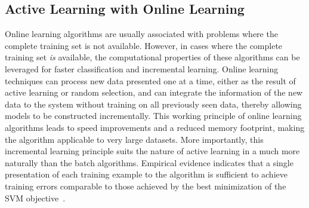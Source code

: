 \subsection{Active Learning with Online Learning}
\label{LASVM}
Online learning algorithms are usually associated with problems where the complete training set is not available. However, in cases where the complete training set \textit{is} available, the computational properties of these algorithms can be leveraged for faster classification and incremental learning. Online learning techniques can process new data presented one at a time,  either as the result of active learning or random selection, and can integrate the information of the new  data to the system without training on all previously seen data, thereby allowing models to be constructed incrementally. This working principle of online learning algorithms leads to speed improvements and a reduced memory footprint, making the algorithm applicable to very large datasets. More importantly, this incremental learning principle suits the nature of active learning in a much more naturally than the batch algorithms. Empirical evidence indicates that a single presentation of each training example to the algorithm is sufficient to achieve training errors comparable to those achieved by the best minimization of the SVM objective~\cite{Bordes_2005}.%

